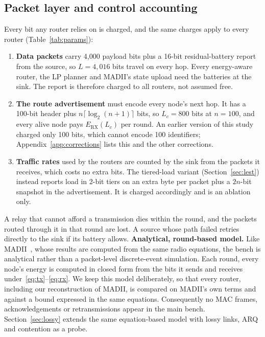 \subsection{Packet layer and control accounting}\label{sec:packet}
Every bit any router relies on is charged, and the same charges apply to every router (Table~\ref{tab:params}):
\begin{enumerate}[label=(\roman*), leftmargin=*]
  \item \textbf{Data packets} carry 4{,}000 payload bits plus a 16-bit residual-battery report from the source, so $L=4{,}016$ bits travel on every hop. Every energy-aware router, the LP planner and MADII's state upload need the batteries at the sink. The report is therefore charged to all routers, not assumed free.
  \item \textbf{The route advertisement} must encode every node's next hop. It has a 100-bit header plus $n\lceil\log_2(n+1)\rceil$ bits, so $L_c=800$ bits at $n=100$, and every alive node pays $E_{\mathrm{RX}}(L_c)$ per round. An earlier version of this study charged only 100 bits, which cannot encode 100 identifiers; Appendix~\ref{app:corrections} lists this and the other corrections.
  \item \textbf{Traffic rates} used by the routers are counted by the sink from the packets it receives, which costs no extra bits. The tiered-load variant (Section~\ref{sec:lest}) instead reports load in 2-bit tiers on an extra byte per packet plus a $2n$-bit snapshot in the advertisement. It is charged accordingly and is an ablation only.
\end{enumerate}
A relay that cannot afford a transmission dies within the round, and the packets routed through it in that round are lost. A source whose path failed retries directly to the sink if its battery allows. \textbf{Analytical, round-based model.} Like MADII~\cite{yang2025madii}, whose results are computed from the same radio equations, the bench is analytical rather than a packet-level discrete-event simulation. Each round, every node's energy is computed in closed form from the bits it sends and receives under~\eqref{eq:tx}--\eqref{eq:rx}. We keep this model deliberately, so that every router, including our reconstruction of MADII, is compared on MADII's own terms and against a bound expressed in the same equations. Consequently no MAC frames, acknowledgements or retransmissions appear in the main bench. Section~\ref{sec:lossy} extends the same equation-based model with lossy links, ARQ and contention as a probe.

